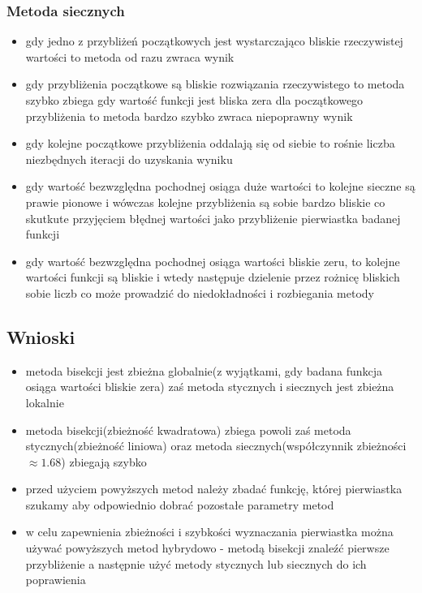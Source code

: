 \documentclass{article}
\begin{document}
\subsubsection{Metoda siecznych}
\begin{itemize}
    \item gdy jedno z przybliżeń początkowych jest wystarczająco bliskie rzeczywistej wartości to metoda od razu zwraca wynik
    \item gdy przybliżenia początkowe są bliskie rozwiązania rzeczywistego to metoda szybko zbiega
    gdy wartość funkcji jest bliska zera dla początkowego przybliżenia to metoda bardzo szybko zwraca niepoprawny wynik
    \item gdy kolejne początkowe przybliżenia oddalają się od siebie to rośnie liczba niezbędnych iteracji do uzyskania wyniku
    \item gdy wartość bezwzględna pochodnej osiąga duże wartości to kolejne sieczne są prawie pionowe i wówczas kolejne przybliżenia są sobie bardzo bliskie co skutkute przyjęciem błędnej wartości jako przybliżenie pierwiastka badanej funkcji
    \item gdy wartość bezwzględna pochodnej osiąga wartości bliskie zeru, to kolejne wartości funkcji są bliskie i wtedy następuje dzielenie przez rożnicę bliskich sobie liczb co może prowadzić do niedokładności i rozbiegania metody
\end{itemize}

\subsection{Wnioski}
\begin{itemize}
    \item metoda bisekcji jest zbieżna globalnie(z wyjątkami, gdy badana funkcja osiąga wartości bliskie zera) zaś metoda stycznych i siecznych jest zbieżna lokalnie
    \item metoda bisekcji(zbieżność kwadratowa) zbiega powoli zaś metoda stycznych(zbieżność liniowa) oraz metoda siecznych(współczynnik zbieżności $\approx 1.68$) zbiegają szybko
    \item przed użyciem powyższych metod należy zbadać funkcję, której pierwiastka szukamy aby odpowiednio dobrać pozostałe parametry metod
    \item w celu zapewnienia zbieżności i szybkości wyznaczania pierwiastka można używać powyższych metod hybrydowo - metodą bisekcji znaleźć pierwsze przybliżenie a następnie użyć metody stycznych lub siecznych do ich poprawienia
\end{itemize}
\end{document}
